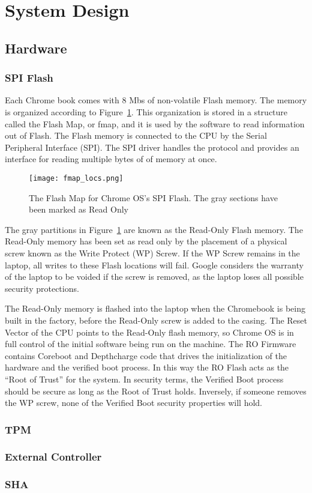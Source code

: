 \documentclass[../report.tex]{subfiles}
\begin{document}
\doublespacing

\section{System Design}

\subsection{Hardware}

\subsubsection{SPI Flash}

Each Chrome book comes with 8 Mbs of non-volatile Flash memory.
The memory is organized according to Figure~\ref{fig:fmap}. 
This organization is stored in a structure called the Flash Map, or fmap, and it is used by the software to read information out of Flash.
The Flash memory is connected to the CPU by the Serial Peripheral Interface (SPI).
The SPI driver handles the protocol and provides an interface for reading multiple bytes of of memory at once.

\begin{figure}
  \centering
  \texttt{[image: fmap\_locs.png]}
  \caption{The Flash Map for Chrome OS's SPI Flash. The gray sections have been marked as Read Only}
  \label{fig:fmap}
\end{figure}

The gray partitions in Figure~\ref{fig:fmap} are known as the Read-Only Flash memory.
The Read-Only memory has been set as read only by the placement of a physical screw known as the Write Protect (WP) Screw.
If the WP Screw remains in the laptop, all writes to these Flash locations will fail.
Google considers the warranty of the laptop to be voided if the screw is removed, as the laptop loses all possible security protections. 

The Read-Only memory is flashed into the laptop when the Chromebook is being built in the factory, before the Read-Only screw is added to the casing. 
The Reset Vector of the CPU points to the Read-Only flash memory, so Chrome OS is in full control of the initial software being run on the machine.
The RO Firmware contains Coreboot and Depthcharge code that drives the initialization of the hardware and the verified boot process. 
In this way the RO Flash acts as the ``Root of Trust'' for the system.
In security terms, the Verified Boot process should be secure as long as the Root of Trust holds.
Inversely, if someone removes the WP screw, none of the Verified Boot security properties will hold.


\subsubsection{TPM}

\subsubsection{External Controller}

\subsubsection{SHA}
\end{document}
